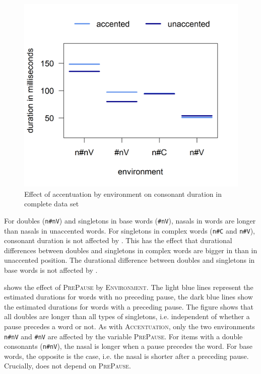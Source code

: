 \begin{figure}
	
	\includegraphics [scale=0.5] {images/Experiment/unModelCompleteInterEnvAcc}
	
	\caption{Effect of accentuation by environment on consonant duration in complete data set}
	\label{fig:NumNasal Acc un experiment}
\end{figure}


 For  doubles (\texttt{n\#nV}) and singletons in base words (\texttt{\#nV}), nasals in  words are longer than nasals in unaccented words.
For singletons in complex words (\texttt{n\#C} and \texttt{n\#V}), consonant duration is not affected by . This has the effect that durational differences between doubles and singletons in complex words are bigger in  than in unaccented position. The durational difference between doubles and singletons in base words is not affected by .







 shows the effect of \textsc{PrePause} by \textsc{Environment}. The light blue lines represent the estimated durations for words with no preceding pause, the dark blue lines show the estimated durations for words with a preceding pause. 
The figure shows that all doubles are longer than all types of singletons, i.e.   independent of whether a pause precedes a word or not.
As with \textsc{Accentuation}, only the two environments \texttt{n\#nV} and \texttt{\#nV} are affected by the variable \textsc{PrePause}. For items with a double consonants (\texttt{n\#nV}), the nasal is longer when a pause precedes the word. For base words, the opposite is the case, i.e. the nasal is shorter after a preceding pause.
Crucially,  does not depend on \textsc{PrePause}. 

